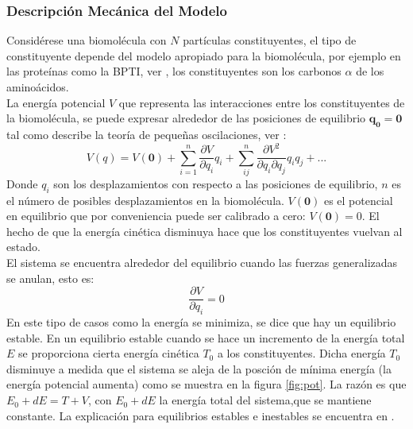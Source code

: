 \subsubsection{Descripci\'{o}n Mec\'{a}nica del Modelo}

Consid\'{e}rese una biomol\'{e}cula con $N$ part\'{i}culas constituyentes, el tipo de constituyente depende del modelo apropiado para la biomol\'{e}cula, por ejemplo en las prote\'{i}nas como la BPTI, ver \cite{Gur2013GlobalPredictions.}, los constituyentes son los carbonos $\alpha$ de los amino\'{a}cidos.\\

La energ\'{i}a potencial $V$ que representa las interacciones entre los constituyentes de la biomol\'{e}cula, se puede expresar alrededor de las posiciones de equilibrio $\mathbf{q_0}=\mathbf{0}$ tal como describe la teor\'{i}a de peque\~{n}as oscilaciones, ver \cite{Goldstein2001ClassicalMechanics}:
\begin{equation}
V(q)=V(\mathbf{0})+\sum_{i=1}^n\frac{\partial V}{\partial q_i}q_i+\sum_{ij}^{n}\frac{\partial V^2 }{\partial q_i\partial q_j}q_i q_j+...
\end{equation}\label{eq:1}
Donde $q_i$ son los desplazamientos con respecto a las posiciones de equilibrio, $n$ es el n\'{u}mero de posibles desplazamientos en la biomol\'{e}cula. $V(\mathbf{0})$ es el potencial en equilibrio que por conveniencia puede ser calibrado a cero: $V(\mathbf{0})=0$. El hecho de que la energ\'{i}a cin\'{e}tica disminuya hace que los constituyentes vuelvan al estado.\\


El sistema se encuentra alrededor del equilibrio cuando las fuerzas generalizadas se anulan, esto es:
\begin{equation}
\frac{\partial V}{\partial q_i}=0
\end{equation}\label{eq:2}
En este tipo de casos como la energ\'{i}a se minimiza, se dice que hay un equilibrio estable. En un equilibrio estable cuando se hace un incremento de la energ\'{i}a total $E$ se proporciona cierta energ\'{i}a cin\'{e}tica $T_0$ a los constituyentes. Dicha energ\'{i}a  $T_0$  disminuye a medida que el sistema se aleja de la posci\'{o}n de m\'{i}nima energ\'{i}a (la energ\'{i}a potencial aumenta) como se muestra en la figura \ref{fig:pot}. La raz\'{o}n es que $E_0+dE=T+V$, con $E_0+dE$ la energ\'{i}a total del sistema,que se mantiene constante. La explicaci\'{o}n para equilibrios estables e inestables se encuentra en \cite{Goldstein2001ClassicalMechanics}.\\

